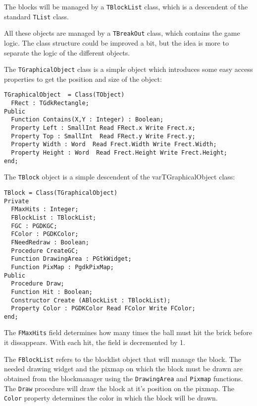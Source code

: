 \documentclass[10pt]{article}
\newcommand{\var}[1]{\texttt{#1}}
\begin{document}
The blocks will be managed by a \var{TBlockList} class, which is a
descendent of the standard \var{TList} class. 

All these objects are managed by a \var{TBreakOut} class, which contains the
game logic. The class structure could be improved a bit, but the idea is
more to separate the logic of the different objects.

The \var{TGraphicalObject} class is a simple object which introduces some 
easy access properties to get the position and size of the object:
\begin{verbatim}
TGraphicalObject  = Class(TObject)
  FRect : TGdkRectangle;
Public 
  Function Contains(X,Y : Integer) : Boolean;
  Property Left : SmallInt Read FRect.x Write Frect.x;
  Property Top : SmallInt  Read FRect.y Write Frect.y;
  Property Width : Word  Read Frect.Width Write Frect.Width;
  Property Height : Word  Read Frect.Height Write Frect.Height;
end;
\end{verbatim}

The \var{TBlock} object is a simple descendent of the var{TGraphicalObject}
class:
\begin{verbatim}
TBlock = Class(TGraphicalObject)
Private
  FMaxHits : Integer;
  FBlockList : TBlockList;
  FGC : PGDKGC;
  FColor : PGDKColor;
  FNeedRedraw : Boolean;
  Procedure CreateGC;
  Function DrawingArea : PGtkWidget;
  Function PixMap : PgdkPixMap; 
Public
  Procedure Draw;
  Function Hit : Boolean;
  Constructor Create (ABlockList : TBlockList);
  Property Color : PGDKColor Read FColor Write FColor;
end;
\end{verbatim}
The \var{FMaxHits} field determines how many times the ball must hit the
brick before it dissappears. With each hit, the field is decremented by 1.

The \var{FBlockList} refers to the blocklist object that will manage the 
block. The needed drawing widget and the pixmap on which the block must be
drawn are obtained from the blockmanager using the \var{DrawingArea} and 
\var{Pixmap} functions.
The \var{Draw} procedure will draw the block at it's position on the pixmap.
The \var{Color} property determines the color in which the block will be
drawn.
\end{document}
